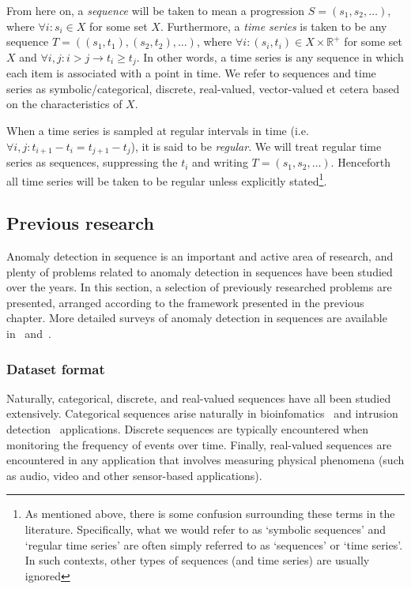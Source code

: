 From here on, a \emph{sequence} will be taken to mean a progression $S = (s_1, s_2, \dots)$, where $\forall i: s_i \in X$ for some set $X$. Furthermore, a \emph{time series} is taken to be any sequence $T = ((s_1, t_1), (s_2, t_2), \dots)$, where $\forall i: (s_i, t_i) \in X \times \mathbb{R}^+$ for some set $X$ and $\forall i, j: i > j \rightarrow t_i \geq t_j$. In other words, a time series is any sequence in which each item is associated with a point in time. We refer to sequences and time series as symbolic/categorical, discrete, real-valued, vector-valued et cetera based on the characteristics of $X$.

When a time series is sampled at regular intervals in time (i.e.\ $\forall i, j: t_{i+1} - t_i = t_{j+1} - t_j$), it is said to be \emph{regular}. We will treat regular time series as sequences, suppressing the $t_i$ and writing $T = (s_1, s_2, \dots)$. Henceforth all time series will be taken to be regular unless explicitly stated\footnote{As mentioned above, there is some confusion surrounding these terms in the literature. Specifically, what we would refer to as `symbolic sequences' and `regular time series' are often simply referred to as `sequences' or `time series'. In such contexts, other types of sequences (and time series) are usually ignored}.

\subsection{Previous research}
\label{sect:prev_research}

Anomaly detection in sequence is an important and active area of research, and plenty of problems related to anomaly detection in sequences have been studied over the years. In this section, a selection of previously researched problems are presented, arranged according to the framework presented in the previous chapter. More detailed surveys of anomaly detection in sequences are available in~\cite{chandola} and~\cite{TODO}.

\subsubsection{Dataset format}

Naturally, categorical, discrete, and real-valued sequences have all been studied extensively. Categorical sequences arise naturally in bioinfomatics~\cite{TODO} and intrusion detection~\cite{TODO} applications. Discrete sequences are typically encountered when monitoring the frequency of events over time. Finally, real-valued sequences are encountered in any application that involves measuring physical phenomena (such as audio, video and other sensor-based applications).


